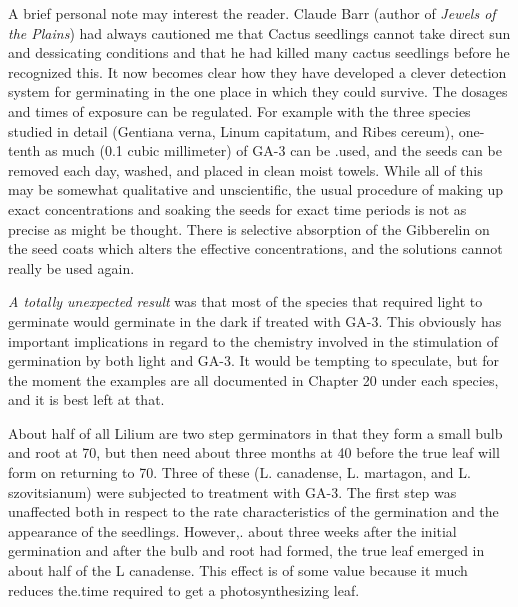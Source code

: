 A brief personal note may interest the reader. Claude Barr (author of \textit{Jewels of
the Plains}) had always cautioned me that Cactus seedlings cannot take direct sun and
dessicating conditions and that he had killed many cactus seedlings before he
recognized this. It now becomes clear how they have developed a clever detection
system for germinating in the one place in which they could survive.
The dosages and times of exposure can be regulated. For example with the
three species studied in detail (Gentiana verna, Linum capitatum, and Ribes cereum),
one-tenth as much (0.1 cubic millimeter) of GA-3 can be .used, and the seeds can be
removed each day, washed, and placed in clean moist towels. While all of this may be
somewhat qualitative and unscientific, the usual procedure of making up exact
concentrations and soaking the seeds for exact time periods is not as precise as might
be thought. There is selective absorption of the Gibberelin on the seed coats which
alters the effective concentrations, and the solutions cannot really be used again.

\textit{A totally unexpected result} was that most of the species that required light to
germinate would germinate in the dark if treated with GA-3. This obviously has
important implications in regard to the chemistry involved in the stimulation of
germination by both light and GA-3. It would be tempting to speculate, but for the
moment the examples are all documented in Chapter 20 under each species, and it is
best left at that.

About half of all Lilium are two step germinators in that they form a small bulb
and root at 70, but then need about three months at 40 before the true leaf will form on
returning to 70. Three of these (L. canadense, L. martagon, and L. szovitsianum) were
subjected to treatment with GA-3. The first step was unaffected both in respect to the
rate characteristics of the germination and the appearance of the seedlings. However,.
about three weeks after the initial germination and after the bulb and root had formed,
the true leaf emerged in about half of the L canadense. This effect is of some value
because it much reduces the.time required to get a photosynthesizing leaf.


